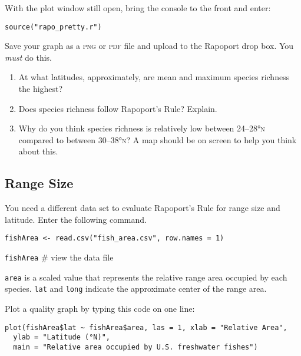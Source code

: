 \documentclass[11pt]{article}
\begin{document}
With the plot window still open, bring the console to the front and 
enter:

\texttt{source("rapo\_pretty.r")}

Save your graph as a \textsc{png} or \textsc{pdf} file and upload to 
the Rapoport drop box. You \emph{must} do this.

\begin{enumerate}
	\item At what latitudes, approximately, are mean and maximum 
	species richness the highest? 

	\vspace{5\baselineskip}

	\item Does species richness follow Rapoport's Rule? Explain.

	
	\newpage

	\item Why do you think species richness is relatively low between
	24–28°\textsc{n} compared to between 30–38°\textsc{n}? A map should be on screen to 
	help you think about this.

	\vspace{7\baselineskip}

\end{enumerate}

\subsection*{Range Size}

You need a different data set to evaluate Rapoport's Rule for range 
size and latitude. Enter the following command.

\begin{verbatim}
fishArea <- read.csv("fish_area.csv", row.names = 1)
\end{verbatim}

\texttt{fishArea} \qquad \# view the data file

\texttt{area} is a scaled value that represents the relative range area
 occupied by each species. \texttt{lat} and \texttt{long} indicate the
 approximate center of the range area.

 Plot a quality graph by typing this code on one line:

\begin{verbatim}
plot(fishArea$lat ~ fishArea$area, las = 1, xlab = "Relative Area",
  ylab = "Latitude (°N)",
  main = "Relative area occupied by U.S. freshwater fishes")
\end{verbatim}
\end{document}
